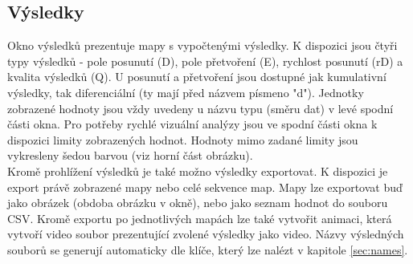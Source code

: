 \documentclass[a4paper,12pt]{article}
\begin{document}
\subsection{Výsledky}
\begin{figure}[H]
\end{figure}
Okno výsledků prezentuje mapy s vypočtenými výsledky. K dispozici jsou čtyři typy výsledků - pole posunutí (D), pole přetvoření (E), rychlost posunutí (rD) a kvalita výsledků (Q). U posunutí a přetvoření jsou dostupné jak kumulativní výsledky, tak diferenciální (ty mají před názvem písmeno "d"). Jednotky zobrazené hodnoty jsou vždy uvedeny u názvu typu (směru dat) v levé spodní části okna. Pro potřeby rychlé vizuální analýzy jsou ve spodní části okna k dispozici limity zobrazených hodnot. Hodnoty mimo zadané limity jsou vykresleny šedou barvou (viz horní část obrázku).\\
Kromě prohlížení výsledků je také možno výsledky exportovat. K dispozici je export právě zobrazené mapy nebo celé sekvence map. Mapy lze exportovat buď jako obrázek (obdoba obrázku v okně), nebo jako seznam hodnot do souboru CSV. Kromě exportu po jednotlivých mapách lze také vytvořit animaci, která vytvoří video soubor prezentující zvolené výsledky jako video. Názvy výsledných souborů se generují automaticky dle klíče, který lze nalézt v kapitole \ref{sec:names}.
\begin{figure}[H]
\end{figure}
\end{document}
